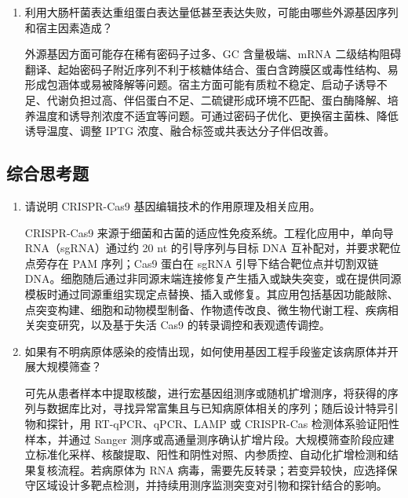 \documentclass[a4paper]{article}
\begin{document}
\begin{enumerate}[label=\arabic*.]
	影响因素包括分离胶浓度、交联度、浓缩胶质量、缓冲液 pH 和离子强度、SDS 含量、样品变性是否充分、还原剂使用、电压和发热控制、上样量、蛋白降解、盐和核酸等杂质。目标蛋白分子量越接近，越需要选择合适胶浓度和稳定电泳条件。

	\item 利用大肠杆菌表达重组蛋白表达量低甚至表达失败，可能由哪些外源基因序列和宿主因素造成？

	外源基因方面可能存在稀有密码子过多、GC 含量极端、mRNA 二级结构阻碍翻译、起始密码子附近序列不利于核糖体结合、蛋白含跨膜区或毒性结构、易形成包涵体或易被降解等问题。宿主方面可能有质粒不稳定、启动子诱导不足、代谢负担过高、伴侣蛋白不足、二硫键形成环境不匹配、蛋白酶降解、培养温度和诱导剂浓度不适宜等问题。可通过密码子优化、更换宿主菌株、降低诱导温度、调整 IPTG 浓度、融合标签或共表达分子伴侣改善。
\end{enumerate}

\subsection{综合思考题}

\begin{enumerate}[label=\arabic*.]
	\item 请说明 CRISPR-Cas9 基因编辑技术的作用原理及相关应用。

	CRISPR-Cas9 来源于细菌和古菌的适应性免疫系统。工程化应用中，单向导 RNA（sgRNA）通过约 20 nt 的引导序列与目标 DNA 互补配对，并要求靶位点旁存在 PAM 序列；Cas9 蛋白在 sgRNA 引导下结合靶位点并切割双链 DNA。细胞随后通过非同源末端连接修复产生插入或缺失突变，或在提供同源模板时通过同源重组实现定点替换、插入或修复。其应用包括基因功能敲除、点突变构建、细胞和动物模型制备、作物遗传改良、微生物代谢工程、疾病相关突变研究，以及基于失活 Cas9 的转录调控和表观遗传调控。

	\item 如果有不明病原体感染的疫情出现，如何使用基因工程手段鉴定该病原体并开展大规模筛查？

	可先从患者样本中提取核酸，进行宏基因组测序或随机扩增测序，将获得的序列与数据库比对，寻找异常富集且与已知病原体相关的序列；随后设计特异引物和探针，用 RT-qPCR、qPCR、LAMP 或 CRISPR-Cas 检测体系验证阳性样本，并通过 Sanger 测序或高通量测序确认扩增片段。大规模筛查阶段应建立标准化采样、核酸提取、阳性和阴性对照、内参质控、自动化扩增检测和结果复核流程。若病原体为 RNA 病毒，需要先反转录；若变异较快，应选择保守区域设计多靶点检测，并持续用测序监测突变对引物和探针结合的影响。
\end{enumerate}
\end{document}
